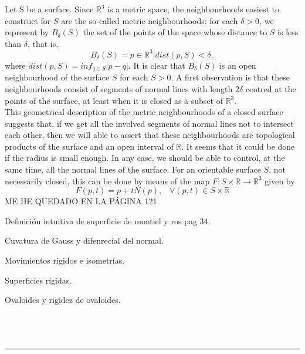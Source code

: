 Let S be a surface. Since $\mathbb{R}^3$ is a metric space, the neighbourhoods easiest to construct for $S$ are the so-called metric neighbourhoods: for each $\delta > 0$, we represent by $B_{\delta}(S)$ the set of the points of the space whose distance to $S$ is less than $\delta$, that is,
$$ B_{\delta}(S) = {p \in \mathbb{R}^3 | dist (p, S) < \delta}, $$
where $dist(p, S) = inf_{q \in S} |p - q|$. It is clear that $B_{\delta}(S)$ is an open neighbourhood of the surface $S$ for each $S > 0$. A first observation is that these neighbourhoods consist of segments of normal lines with length $2\delta$ centred at the points of the surface, at least when it is closed as a subset of $\mathbb{R}^3$.
${ }$\\

This geometrical description of the metric neighbourhoods of a closed surface suggests that, if we get all the involved segments of normal lines not to intersect each other, then we will able to assert that these neighbourhoods are topological products of the surface and an open interval of $\mathbb{R}$. It seems that it could be done if the radius is small enough. In any case, we should be able to control, at the same time, all the normal lines of the surface. For an orientable surface $S$, not necessarily closed, this can be done by means of the map $F:S \times \mathbb{R} \to \mathbb{R}^3$ given by
$$ F(p,t) = p + tN(p), \;\;\; \forall (p,t) \in S \times \mathbb{R} $$
${ }$\\





ME HE QUEDADO EN LA PÁGINA 121




Definición intuitiva de superficie de montiel y ros pag 34.

Cuvatura de Gauss y difenrecial del normal.

Movimientos rígidos e isometrías.

Superficies rígidas.

Ovaloides y rigidez de ovaloides.

\vspace{0.7cm}
\\

\chapter*{}
\thispagestyle{empty}

\noindent\rule[-1ex]{\textwidth}{2pt}\\[4.5ex]


